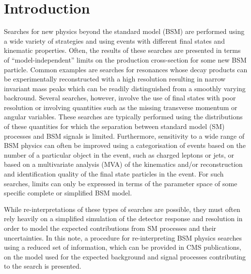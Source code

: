 \section{Introduction}
\label{sec:intro}

Searches for new physics beyond the standard model (BSM) are performed using a wide variety of 
strategies and using events with different final states and kinematic properties.  Often, 
the results of these searches are presented in terms of ``model-independent'' limits on the production 
cross-section for some new BSM particle. Common examples are searches for resonances whose decay products 
can be experimentally reconstructed with a high resolution resulting in narrow invariant mass peaks which can be readily distinguished from 
a smoothly varying backround. Several searches, however, involve the use of final states with poor resolution or involving 
quantities such as the missing transverse momentum \ptvecmiss or angular variables. These searches are typically performed using the 
distributions of these quantities for which the separation between standard model (SM) processes and BSM signals is limited. Furthermore, 
sensitivity to a wide range of BSM physics can often be improved using a categorisation of events based on the number of a particular 
object in the event, such as charged leptons or jets, or based on a multivariate analysis (MVA) of the kinematics and/or reconstruction and 
identification quality of the final state particles in the event. For such searches, limits can only be expressed in terms of the 
parameter space of some specific complete or simplified BSM model.

While re-interpretations of these types of searches are possible, they must often rely heavily on a simplified simulation of 
the detector response and resolution in order to model the expected contributions from SM processes and their uncertainties. 
In this note, a procedure for re-interpreting BSM physics searches using a reduced set of information, which can be provided in CMS publications, 
on the model used for the expected background and signal processes contributing to the search is presented. 



